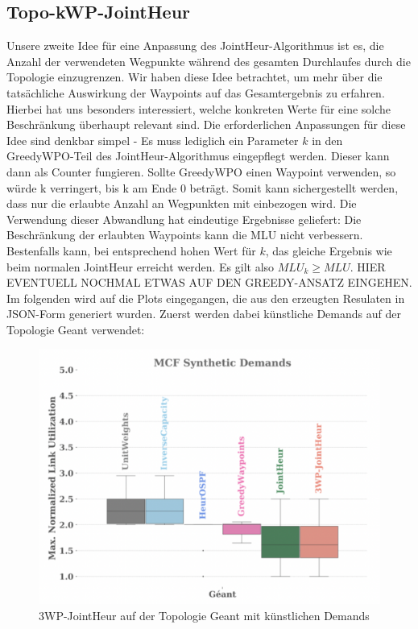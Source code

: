 \documentclass[sigconf]{acmart}
\begin{document}
\subsection{Topo-kWP-JointHeur}
Unsere zweite Idee für eine Anpassung des JointHeur-Algorithmus ist es, die Anzahl der verwendeten 
Wegpunkte während des gesamten Durchlaufes durch die Topologie einzugrenzen. Wir haben diese Idee
betrachtet, um mehr über die tatsächliche Auswirkung der Waypoints auf das Gesamtergebnis zu erfahren.
Hierbei hat uns besonders interessiert, welche konkreten Werte für eine solche Beschränkung überhaupt
relevant sind. 
Die erforderlichen Anpassungen für diese Idee sind denkbar simpel - Es muss lediglich ein Parameter $k$ in den 
GreedyWPO-Teil des JointHeur-Algorithmus eingepflegt werden. Dieser kann dann als Counter fungieren. Sollte GreedyWPO
einen Waypoint verwenden, so würde k verringert, bis k am Ende 0 beträgt. Somit kann sichergestellt werden, dass nur die
erlaubte Anzahl an Wegpunkten mit einbezogen wird. Die Verwendung dieser Abwandlung hat eindeutige Ergebnisse geliefert: Die Beschränkung der erlaubten Waypoints kann die
MLU nicht verbessern. Bestenfalls kann, bei entsprechend hohen Wert für $k$, das gleiche Ergebnis wie beim normalen 
JointHeur erreicht werden. Es gilt also $MLU_k \geq MLU$. HIER EVENTUELL NOCHMAL ETWAS AUF DEN GREEDY-ANSATZ EINGEHEN.
Im folgenden wird auf die Plots eingegangen, die aus den erzeugten Resulaten in JSON-Form generiert wurden.
Zuerst werden dabei künstliche Demands auf der Topologie Geant verwendet:
\begin{figure}[h]
  \centering
  \includegraphics[width=\linewidth]{abbildungen/syntDemtopokwp}
  \caption{3WP-JointHeur auf der Topologie Geant mit künstlichen Demands}
\end{figure}
\end{document}
